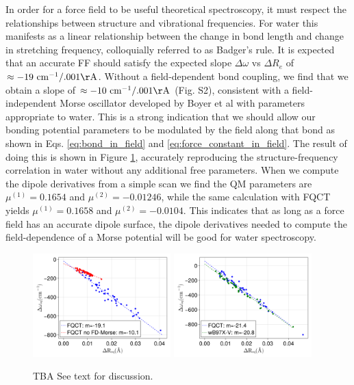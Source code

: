 \documentclass[journal=jctcce,manuscript=article]{achemso}
\begin{document}
In order for a force field to be useful theoretical spectroscopy, it must respect the relationships
between structure and vibrational frequencies. For water this manifests as a linear
relationship between the change in bond length and change in  stretching frequency\cite{boyer2019beyond}, colloquially referred to as Badger's rule.\cite{badger1934relation} It is expected that an accurate FF should satisfy the expected slope
$\Delta\omega$ vs $\Delta R_e$ of $\approx -19\ \mathrm{cm^{-1}/.001\AA}$\cite{boyer2019beyond}. Without a field-dependent bond coupling, we find that 
we obtain a slope of $\approx -10\ \mathrm{cm^{-1}/.001\AA}$ (Fig. S2), consistent with a field-independent Morse
oscillator developed by Boyer et al with parameters appropriate to water.\cite{boyer2019beyond} This is a strong indication that we should allow our bonding potential parameters to be modulated by the field along that bond as shown in Eqs. \ref{eq:bond_in_field} and \ref{eq:force_constant_in_field}. The result of doing this is shown in Figure \ref{fig:badger}, accurately reproducing the structure-frequency correlation
in water without any additional free parameters. When we compute the dipole derivatives from a simple  scan we find the QM parameters are $\mu^{(1)}=0.1654$ and $\mu^{(2)}=-0.01246$, while the same calculation with FQCT yields $\mu^{(1)}=0.1658$ and $\mu^{(2)}=-0.0104$. This indicates that as
long as a force field has an accurate dipole surface, the dipole derivatives needed to compute
the field-dependence of a Morse potential will be good for water spectroscopy.

\begin{figure}[H]
   \includegraphics*[width=0.475\textwidth]{figures/badger_correlation_no_fd_morse.png}
     \includegraphics*[width=0.475\textwidth]{figures/badger_correlation_final.png}
  \caption{TBA See text for discussion.}
  \label{fig:badger}
\end{figure}
\end{document}
